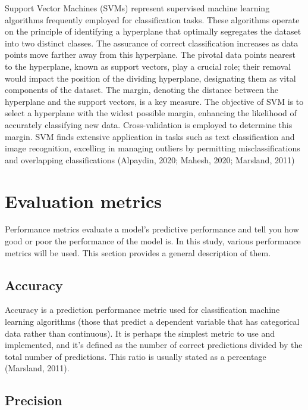 \documentclass[
  man]{apa7}
\begin{document}
Support Vector Machines (SVMs) represent supervised machine learning algorithms frequently employed for classification tasks.
These algorithms operate on the principle of identifying a hyperplane that optimally segregates the dataset into two distinct classes.
The assurance of correct classification increases as data points move farther away from this hyperplane.
The pivotal data points nearest to the hyperplane, known as support vectors, play a crucial role; their removal would impact the position of the dividing hyperplane, designating them as vital components of the dataset.
The margin, denoting the distance between the hyperplane and the support vectors, is a key measure.
The objective of SVM is to select a hyperplane with the widest possible margin, enhancing the likelihood of accurately classifying new data.
Cross-validation is employed to determine this margin.
SVM finds extensive application in tasks such as text classification and image recognition, excelling in managing outliers by permitting misclassifications and overlapping classifications (Alpaydin, 2020; Mahesh, 2020; Marsland, 2011)

\hypertarget{evaluation-metrics}{%
\section{Evaluation metrics}\label{evaluation-metrics}}

Performance metrics evaluate a model's predictive performance and tell you how good or poor the performance of the model is.
In this study, various performance metrics will be used.
This section provides a general description of them.

\hypertarget{accuracy}{%
\subsection{Accuracy}\label{accuracy}}

Accuracy is a prediction performance metric used for classification machine learning algorithms (those that predict a dependent variable that has categorical data rather than continuous).
It is perhaps the simplest metric to use and implemented, and it's defined as the number of correct predictions divided by the total number of predictions.
This ratio is usually stated as a percentage (Marsland, 2011).

\hypertarget{precision}{%
\subsection{Precision}\label{precision}}
\end{document}

